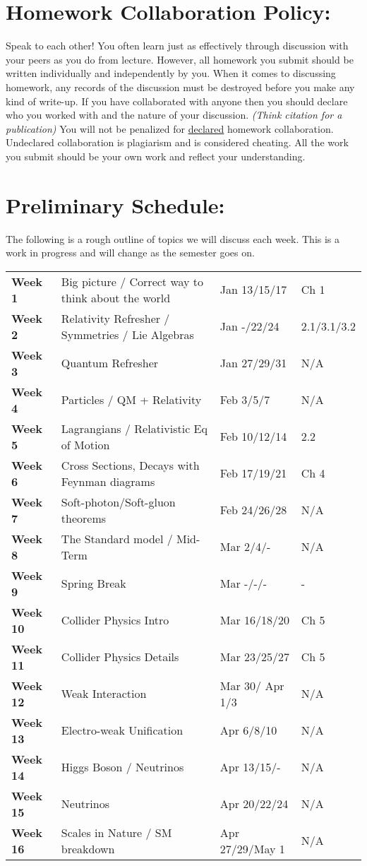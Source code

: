 \documentclass[margin,line]{res}
\begin{document}
\begin{resume}
\section{Homework Collaboration Policy:} 

Speak to each other!
You often learn just as effectively through discussion with your peers as you do from lecture. 
However, all homework you submit should be written individually and independently by you.
When it comes to discussing homework, any records of the discussion must be destroyed before you make any kind of write-up. 
If you have collaborated with anyone then you should declare who you worked with and the nature of your discussion. 
\textit{(Think citation for a publication)}
You will not be penalized for \underline{declared} homework collaboration. 
Undeclared collaboration is plagiarism and is considered cheating. 
All the work you submit should be your own work and reflect your understanding.


\section{Preliminary Schedule:}

The following is a rough outline of topics we will discuss each week. 
This is a work in progress and will change as the semester goes on.

\begin{tabular}{llll}
\textbf{Week 1}  & Big picture / Correct way to think about the world & Jan 13/15/17 & Ch 1\\
\textbf{Week 2}  & Relativity Refresher / Symmetries /  Lie Algebras & Jan -/22/24 & 2.1/3.1/3.2\\
\textbf{Week 3}  & Quantum Refresher  & Jan 27/29/31 & N/A\\
\textbf{Week 4}  & Particles / QM + Relativity & Feb 3/5/7 & N/A\\
\textbf{Week 5}  & Lagrangians / Relativistic Eq of Motion & Feb 10/12/14 & 2.2\\
\textbf{Week 6}  & Cross Sections, Decays with Feynman diagrams  & Feb 17/19/21 & Ch 4\\
\textbf{Week 7}  & Soft-photon/Soft-gluon theorems  & Feb 24/26/28 & N/A\\
\textbf{Week 8}  & The Standard model / Mid-Term & Mar 2/4/- & N/A\\
\textbf{Week 9}  & Spring Break & Mar -/-/- & - \\
\textbf{Week 10} & Collider Physics Intro & Mar 16/18/20 & Ch 5 \\
\textbf{Week 11} & Collider Physics Details & Mar 23/25/27 & Ch 5\\
\textbf{Week 12} & Weak Interaction  & Mar 30/ Apr 1/3 & N/A\\
\textbf{Week 13} & Electro-weak Unification & Apr 6/8/10 & N/A\\
\textbf{Week 14} & Higgs Boson / Neutrinos & Apr 13/15/- & N/A\\
\textbf{Week 15} & Neutrinos & Apr 20/22/24 & N/A \\
\textbf{Week 16} & Scales in Nature / SM breakdown  & Apr 27/29/May 1 & N/A\\
\end{tabular}

\end{resume}
\end{document}

